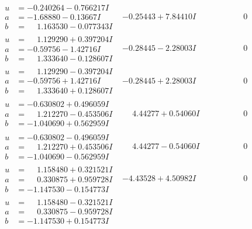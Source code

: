 \documentclass[1p]{elsarticle_modified}
\theoremstyle{definition}
\begin{document}
$$\begin{array}{c|c|c}
\begin{aligned}
u &= -0.240264 - 0.766217 I \\
a &= -1.68880 - 0.13667 I \\
b &= \phantom{-}1.163530 - 0.077343 I\end{aligned}
 & -0.25443 + 7.84410 I & \phantom{-0.000000 } 0 \\ \hline\begin{aligned}
u &= \phantom{-}1.129290 + 0.397204 I \\
a &= -0.59756 - 1.42716 I \\
b &= \phantom{-}1.333640 - 0.128607 I\end{aligned}
 & -0.28445 - 2.28003 I & \phantom{-0.000000 } 0 \\ \hline\begin{aligned}
u &= \phantom{-}1.129290 - 0.397204 I \\
a &= -0.59756 + 1.42716 I \\
b &= \phantom{-}1.333640 + 0.128607 I\end{aligned}
 & -0.28445 + 2.28003 I & \phantom{-0.000000 } 0 \\ \hline\begin{aligned}
u &= -0.630802 + 0.496059 I \\
a &= \phantom{-}1.212270 - 0.453506 I \\
b &= -1.040690 + 0.562959 I\end{aligned}
 & \phantom{-}4.44277 + 0.54060 I & \phantom{-0.000000 } 0 \\ \hline\begin{aligned}
u &= -0.630802 - 0.496059 I \\
a &= \phantom{-}1.212270 + 0.453506 I \\
b &= -1.040690 - 0.562959 I\end{aligned}
 & \phantom{-}4.44277 - 0.54060 I & \phantom{-0.000000 } 0 \\ \hline\begin{aligned}
u &= \phantom{-}1.158480 + 0.321521 I \\
a &= \phantom{-}0.330875 + 0.959728 I \\
b &= -1.147530 - 0.154773 I\end{aligned}
 & -4.43528 + 4.50982 I & \phantom{-0.000000 } 0 \\ \hline\begin{aligned}
u &= \phantom{-}1.158480 - 0.321521 I \\
a &= \phantom{-}0.330875 - 0.959728 I \\
b &= -1.147530 + 0.154773 I\end{aligned}

\end{array}$$
\end{document}
